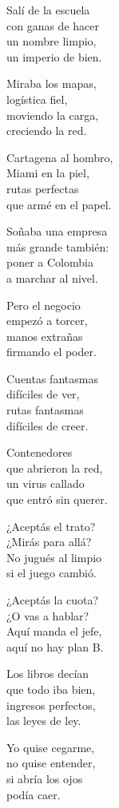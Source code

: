 \begin{lyrics}

Salí de la escuela\\
con ganas de hacer\\
un nombre limpio,\\
un imperio de bien.

Miraba los mapas,\\
logística fiel,\\
moviendo la carga,\\
creciendo la red.

Cartagena al hombro,\\
Miami en la piel,\\
rutas perfectas\\
que armé en el papel.

Soñaba una empresa\\
más grande también:\\
poner a Colombia\\
a marchar al nivel.

Pero el negocio\\
empezó a torcer,\\
manos extrañas\\
firmando el poder.

Cuentas fantasmas\\
difíciles de ver,\\
rutas fantasmas\\
difíciles de creer.

Contenedores\\
que abrieron la red,\\
un virus callado\\
que entró sin querer.

¿Aceptás el trato?\\
¿Mirás para allá?\\
No jugués al limpio\\
si el juego cambió.

¿Aceptás la cuota?\\
¿O vas a hablar?\\
Aquí manda el jefe,\\
aquí no hay plan B.

Los libros decían\\
que todo iba bien,\\
ingresos perfectos,\\
las leyes de ley.

Yo quise cegarme,\\
no quise entender,\\
si abría los ojos\\
podía caer.


\end{lyrics}
